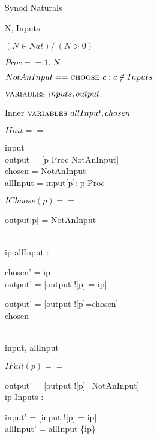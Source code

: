 \begin{module}{Synod}
\EXTENDS Naturals


\CONSTANT N, Inputs

\ASSUME $(N \in Nat) /\ (N>0)$

$Proc == 1 .. N$

$NotAnInput == \mbox{\sc choose } c : c\not\in Inputs$

$\mbox{\sc variables } inputs, output$


\begin{submodule}{Inner}
$\mbox{\sc variables } allInput, chosen$

\midbar


$IInit ==$ 
  \begin{conj} 
    input   \\
    output  = [p \in Proc \mapsto NotAnInput]\\
    chosen  = NotAnInput \\
    allInput  = {input[p]: p \in Proc}
  \end{conj}


$IChoose(p) == $
 \begin{conj}
    output[p] = NotAnInput \\
    \begin{noj}
       \\
        \THEN ip \in allInput : 
          \begin{conj}
            chosen' = ip \\
            output' = [output \EXCEPT ![p] = ip]
          \end{conj}
        \ELSE \begin{conj}
                 output' = [output \EXCEPT ![p]=chosen] \\
                 \UNCHANGED chosen
               \end{conj}
      \FI
    \end{noj} \\
    \UNCHANGED \langle input, allInput \rangle 
  \end{conj}
    

$IFail(p) ==$
  \begin{conj}
    output' = [output \EXCEPT ![p]=NotAnInput] \\
    \E ip \in Inputs : \begin{conj}
                         input' = [input \EXCEPT ![p] = ip]\\
                         allInput' = allInput \cup \{ip\}
                       \end{conj}
  \end{conj}


\end{submodule}
\end{module}
